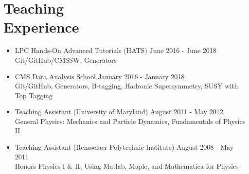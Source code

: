 \section{Teaching\\Experience}
\begin{itemize}[leftmargin=12pt]
\item LPC Hands-On Advanced Tutorials (HATS) \hfill June 2016 - June 2018\\
Git/GitHub/CMSSW, Generators
\item CMS Data Analysis School \hfill January 2016 - January 2018\\
Git/GitHub, Generators, B-tagging, Hadronic Supersymmetry, SUSY with Top Tagging
\item Teaching Assistant (University of Maryland) \hfill August 2011 - May 2012\\
General Physics: Mechanics and Particle Dynamics, Fundamentals of Physics II
\item Teaching Assistant (Rensselaer Polytechnic Institute) \hfill August 2008 - May 2011\\
Honors Physics I \& II, Using Matlab, Maple, and Mathematica for Physics
\end{itemize}